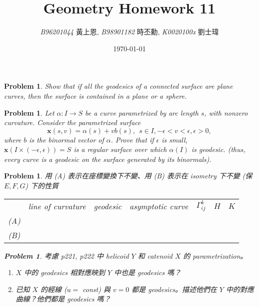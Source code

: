 \documentclass[10pt,a4paper]{article}
\newcommand{\LiHei}{\CJKfamily{lh}}
\newcounter{theProblemCounter}
\newtheorem{problem}[theProblemCounter]{Problem}
\begin{document}
\title{{Geometry Homework 11}}
\author{{\it{B96201044}} {\LiHei 黃上恩}, {\it{B98901182}} {\LiHei 時丕勳}, {\it{K0020100x}} {\LiHei 劉士瑋}}
\date{\today}
\maketitle

\newcommand{\bx}{\mathbb{X}}
\newcommand{\bfx}{\mathbf{x}}
\newcommand{\grad}{\textrm{grad }}
\newcommand{\sech}{\mbox{sech}}

\setcounter{theProblemCounter}{3}
\begin{problem} Show that if all the geodesics of a connected surface are plane curves, then the surface is contained in a plane or a sphere.
\end{problem}

\setcounter{theProblemCounter}{4}
\begin{problem} Let $\alpha: I\to S$ be a curve parametrized by arc length $s$, with nonzero curvature. Consider the parametrized surface
\[ \bfx(s, v) = \alpha(s)+vb(s), \ \ s\in I, -\epsilon<v<\epsilon, \epsilon > 0,\]
where $b$ is the binormal vector of $\alpha$. Prove that if $\epsilon$ is small, $\bfx(I\times (-\epsilon, \epsilon)) = S$ is a regular surface over which $\alpha(I)$ is geodesic. (thus, every curve is a geodesic on the surface generated by its binormals).
\end{problem}

\setcounter{theProblemCounter}{7}
\begin{problem}
用 (A) 表示在座標變換下不變、用 (B) 表示在 isometry 下不變 (保 $E, F, G$) 下的性質

\begin{tabular}{c|c|c|c|c|c|c|}
\cline{2-7}
 & line of curvature & geodesic & asymptotic curve & $\Gamma^{k}_{ij}$ & $H$ & $K$ \\
\cline{2-7}
(A) & & & & & & \\
\cline{2-7}
(B) & & & & & & \\
\cline{2-7}
\end{tabular}

\setcounter{theProblemCounter}{8}
\begin{problem}
考慮 p221, p222 中 helicoid $Y$ 和 catenoid $X$ 的 parametrization。
\begin{enumerate}
\item[(a)] $X$ 中的 geodesics 相對應映到 $Y$ 中也是 geodesics 嗎？
\item[(b)] 已知 $X$ 的經線 ($u = $ const) 與 $v=0$ 都是 geodesics。描述他們在 $Y$ 中的對應曲線？他們都是 geodesics 嗎？
\end{enumerate}
\end{problem}

\end{problem}
\end{document}
